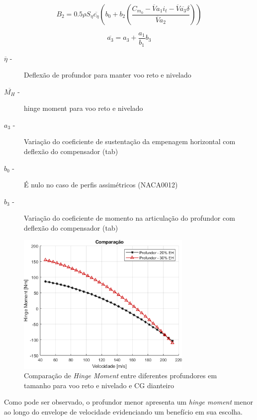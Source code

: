 \begin{equation}
\label{voo1g_7}
B_2 = 0.5 \rho S_{\eta} \overline{c_{\eta}} (b_0 + b_2 (\frac{C_{m_0} - \overline{V} a_1 i_t - \overline{V} \overline{a_3} \delta}{\overline{V} a_2}))
\end{equation}

\begin{equation}
\overline{a_3} = a_3 + \frac{a_1}{b_1} b_3
\end{equation}


\begin{description}
\item[$\overline{\eta}$ -] Deflexão de profundor para manter voo reto e nivelado
\item[$\overline{M_H}$ -] hinge moment para voo reto e nivelado
\item[$a_3$ -] Variação do coeficiente de sustentação da empenagem horizontal com deflexão do compensador (tab)
\item[$b_0$ -] É nulo no caso de perfis assimétricos (NACA0012)
\item[$b_3$ -] Variação do coeficiente de momento na articulação do profundor com deflexão do compensador (tab)
\end{description}

\begin{figure}[H]
\centering
\includegraphics[width=0.75\textwidth]{images/parte3/comparacao_hingemoment.png}
\caption[Comparação de \textit{Hinge Moment} entre diferentes profundores em tamanho]{Comparação de \textit{Hinge Moment} entre diferentes profundores em tamanho para voo reto e nivelado e CG dianteiro}
\label{fig:comp_hingemoment}
\end{figure}

Como pode ser observado, o profundor menor apresenta um \textit{hinge moment} menor ao longo do envelope de velocidade evidenciando um benefício em sua escolha.


